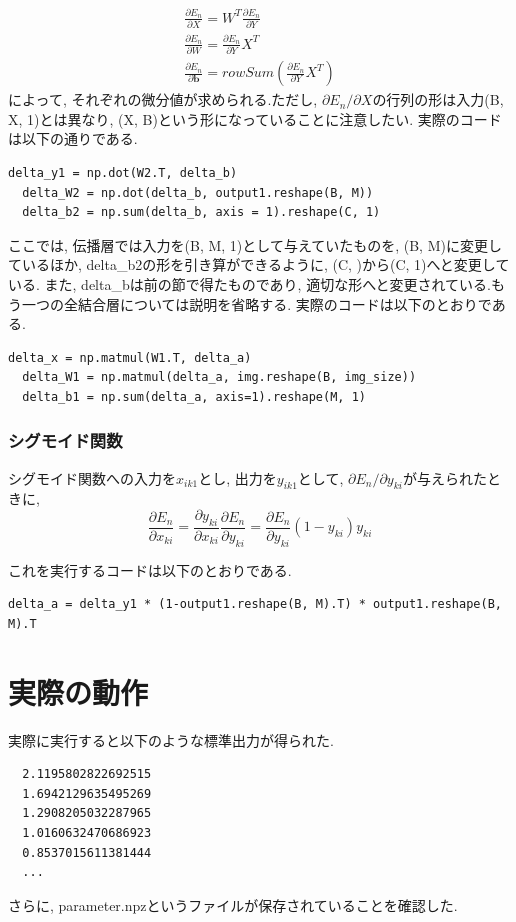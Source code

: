 \documentclass[a4paper,11pt]{jsarticle}
\begin{document}
\begin{gather}
  \frac{\partial E_n}{\partial X} = W^T \frac{\partial E_n}{\partial Y} \\
  \frac{\partial E_n}{\partial W} = \frac{\partial E_n}{\partial Y} X^T \\
  \frac{\partial E_n}{\partial \bm{b}} = rowSum (\frac{\partial E_n}{\partial Y} X^T)
\end{gather}
によって, それぞれの微分値が求められる.ただし,
$\partial E_n / \partial X$の行列の形は入力(B, X, 1)とは異なり,
(X, B)という形になっていることに注意したい.
実際のコードは以下の通りである.
\begin{lstlisting}[caption = 全結合層2]
  delta_y1 = np.dot(W2.T, delta_b)
  delta_W2 = np.dot(delta_b, output1.reshape(B, M))
  delta_b2 = np.sum(delta_b, axis = 1).reshape(C, 1)
\end{lstlisting}
\par
ここでは, 伝播層では入力を(B, M, 1)として与えていたものを,
(B, M)に変更しているほか, delta\_b2の形を引き算ができるように,
(C, )から(C, 1)へと変更している. また, delta\_bは前の節で得たものであり,
適切な形へと変更されている.もう一つの全結合層については説明を省略する.
実際のコードは以下のとおりである.
\begin{lstlisting}[caption = 全結合層1]
  delta_x = np.matmul(W1.T, delta_a)
  delta_W1 = np.matmul(delta_a, img.reshape(B, img_size))
  delta_b1 = np.sum(delta_a, axis=1).reshape(M, 1)
\end{lstlisting}

\subsubsection*{シグモイド関数}
シグモイド関数への入力を$x_{ik1}$とし, 出力を$y_{ik1}$として,
$ \partial E_n / \partial y_{ki}$が与えられたときに,
$$ \frac{\partial E_n}{\partial x_{ki}} =
  \frac{\partial y_{ki}}{\partial x_{ki}} \frac{\partial E_n}{\partial y_{ki}}=
  \frac{\partial E_n}{\partial y_{ki}} (1 - y_{ki}) y_{ki}
$$

これを実行するコードは以下のとおりである.
\begin{lstlisting}[caption=シグモイド関数]
  delta_a = delta_y1 * (1-output1.reshape(B, M).T) * output1.reshape(B, M).T
\end{lstlisting}

\section{実際の動作}
実際に実行すると以下のような標準出力が得られた.
\begin{lstlisting}
  2.1195802822692515
  1.6942129635495269
  1.2908205032287965
  1.0160632470686923
  0.8537015611381444
  ...
\end{lstlisting}
さらに, parameter.npzというファイルが保存されていることを確認した.
\end{document}
